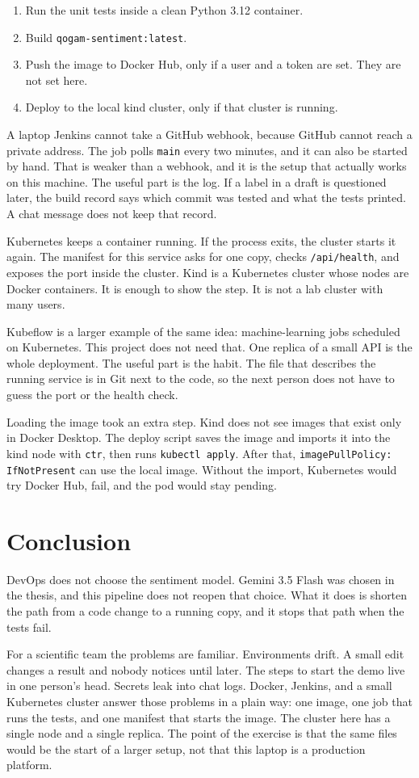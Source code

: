 \documentclass[12pt,a4paper]{article}
\begin{document}
\begin{enumerate}
    \item Run the unit tests inside a clean Python 3.12 container.
    \item Build \texttt{qogam-sentiment:latest}.
    \item Push the image to Docker Hub, only if a user and a token are set. They are not set here.
    \item Deploy to the local kind cluster, only if that cluster is running.
\end{enumerate}

A laptop Jenkins cannot take a GitHub webhook, because GitHub cannot reach a private address. The job polls \texttt{main} every two minutes, and it can also be started by hand. That is weaker than a webhook, and it is the setup that actually works on this machine. The useful part is the log. If a label in a draft is questioned later, the build record says which commit was tested and what the tests printed. A chat message does not keep that record.

Kubernetes keeps a container running. If the process exits, the cluster starts it again. The manifest for this service asks for one copy, checks \texttt{/api/health}, and exposes the port inside the cluster. Kind is a Kubernetes cluster whose nodes are Docker containers. It is enough to show the step. It is not a lab cluster with many users.

Kubeflow is a larger example of the same idea: machine-learning jobs scheduled on Kubernetes. This project does not need that. One replica of a small API is the whole deployment. The useful part is the habit. The file that describes the running service is in Git next to the code, so the next person does not have to guess the port or the health check.

Loading the image took an extra step. Kind does not see images that exist only in Docker Desktop. The deploy script saves the image and imports it into the kind node with \texttt{ctr}, then runs \texttt{kubectl apply}. After that, \texttt{imagePullPolicy: IfNotPresent} can use the local image. Without the import, Kubernetes would try Docker Hub, fail, and the pod would stay pending.

\section{Conclusion}

DevOps does not choose the sentiment model. Gemini 3.5 Flash was chosen in the thesis, and this pipeline does not reopen that choice. What it does is shorten the path from a code change to a running copy, and it stops that path when the tests fail.

For a scientific team the problems are familiar. Environments drift. A small edit changes a result and nobody notices until later. The steps to start the demo live in one person's head. Secrets leak into chat logs. Docker, Jenkins, and a small Kubernetes cluster answer those problems in a plain way: one image, one job that runs the tests, and one manifest that starts the image. The cluster here has a single node and a single replica. The point of the exercise is that the same files would be the start of a larger setup, not that this laptop is a production platform.
\end{document}
